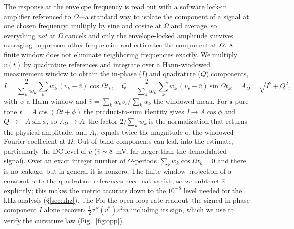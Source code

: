 \documentclass[11pt,a4paper]{article}
\newcommand{\Sig}{\sigma}
\newcommand{\half}{\tfrac{1}{2}}
\providecommand{\DIFaddtex}[1]{{\protect\color{blue} \sf #1}} %
\providecommand{\DIFdeltex}[1]{{\protect\color{red} \scriptsize #1}} %
\providecommand{\DIFaddbegin}{} %
\providecommand{\DIFaddend}{} %
\providecommand{\DIFdelbegin}{} %
\providecommand{\DIFdelend}{} %
\providecommand{\DIFadd}[1]{\texorpdfstring{\DIFaddtex{#1}}{#1}} %
\providecommand{\DIFdel}[1]{\texorpdfstring{\DIFdeltex{#1}}{}} %
\begin{document}
The response at the envelope frequency is read out with a software lock-in
amplifier referenced to $\Omega$---a standard way to isolate the component of a signal
at one chosen frequency: multiply by sine and cosine at $\Omega$ and average, so \DIFdelbegin \DIFdel{everything \emph{not} at $\Omega$ cancels and only the envelope-locked amplitude
survives. }\DIFdelend \DIFaddbegin \DIFadd{averaging suppresses other frequencies and estimates the component at
$\Omega$. A finite window does not eliminate neighboring frequencies exactly. }\DIFaddend We multiply $v(t)$ by quadrature references and
integrate over a Hann-windowed measurement window to obtain the in-phase ($I$) and
quadrature ($Q$) components,
\begin{equation}
I=\frac{2}{\sum_k w_k}\sum_k w_k\,(v_k-\bar v)\cos\Omega t_k,\quad
Q=\frac{2}{\sum_k w_k}\sum_k w_k\,(v_k-\bar v)\sin\Omega t_k,\quad
A_\Omega=\sqrt{I^2+Q^2},
\label{eq:lockin}
\end{equation}
with $w$ a Hann window and $\bar v=\sum_k w_k v_k/\sum_k w_k$ the windowed mean.
For a pure tone $v=A\cos(\Omega t+\phi)$ the product-to-sum identity gives
$I\to A\cos\phi$ and $Q\to -A\sin\phi$, so $A_\Omega\to A$; the factor
$2/\sum_k w_k$ is the normalization that returns the physical amplitude, and
$A_\Omega$ equals twice the magnitude of the windowed Fourier coefficient at
$\Omega$. Out-of-band components can leak into the estimate, particularly the DC level of $v$ ($\bar v\!\sim\!8$~mV, far
larger than the demodulated signal). \DIFdelbegin \DIFdel{Over an exact integer number of $\Omega$-periods $\sum_k w_k\cos\Omega t_k=0$ and there is no leakage, but in
general it is nonzero, }\DIFdelend \DIFaddbegin \DIFadd{The finite-window projection of a constant onto the quadrature references
need not vanish, }\DIFaddend so we subtract $\bar v$ explicitly; this makes the metric
accurate down to the $10^{-8}$ level needed for the kHz
analysis (\S\ref{sec:khz}). \DIFdelbegin \DIFdel{The }\DIFdelend \DIFaddbegin \DIFadd{For the open-loop rate readout, the }\DIFaddend signed
in-phase component $I$ \DIFdelbegin \DIFdel{alone }\DIFdelend recovers
$\half\Sig''(v^*)\varepsilon^2 m$ including its sign, which we use to verify the
curvature law (Fig.~\ref{fig:opp}).
\end{document}
